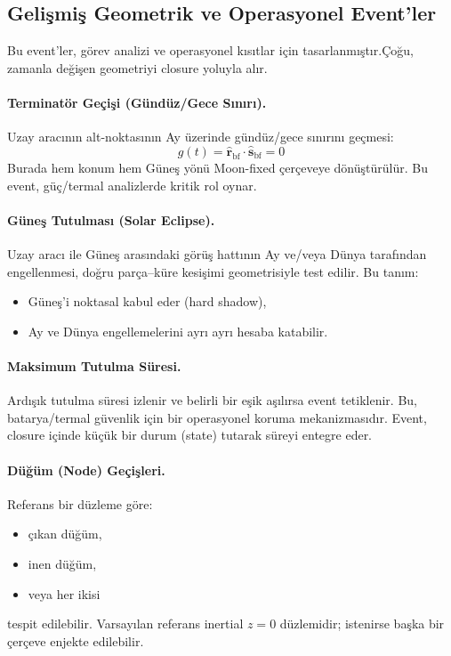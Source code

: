 \subsection*{Gelişmiş Geometrik ve Operasyonel Event’ler}

Bu event’ler, görev analizi ve operasyonel kısıtlar için tasarlanmıştır.Çoğu, zamanla değişen geometriyi closure yoluyla alır.

\paragraph{Terminatör Geçişi (Gündüz/Gece Sınırı).}
Uzay aracının alt-noktasının Ay üzerinde gündüz/gece sınırını geçmesi:
\[
g(t)=\hat{\mathbf{r}}_{\text{bf}}\cdot\hat{\mathbf{s}}_{\text{bf}}=0
\]
Burada hem konum hem Güneş yönü Moon-fixed çerçeveye dönüştürülür.
Bu event, güç/termal analizlerde kritik rol oynar.

\paragraph{Güneş Tutulması (Solar Eclipse).}
Uzay aracı ile Güneş arasındaki görüş hattının Ay ve/veya Dünya tarafından engellenmesi, doğru parça–küre kesişimi geometrisiyle test edilir.
Bu tanım:
\begin{itemize}
  \item Güneş’i noktasal kabul eder (hard shadow),
  \item Ay ve Dünya engellemelerini ayrı ayrı hesaba katabilir.
\end{itemize}

\paragraph{Maksimum Tutulma Süresi.}
Ardışık tutulma süresi izlenir ve belirli bir eşik aşılırsa event tetiklenir. Bu, batarya/termal güvenlik için bir operasyonel koruma mekanizmasıdır. Event, closure içinde küçük bir durum (state) tutarak süreyi entegre eder.

\paragraph{Düğüm (Node) Geçişleri.}
Referans bir düzleme göre:
\begin{itemize}
  \item çıkan düğüm,
  \item inen düğüm,
  \item veya her ikisi
\end{itemize}
tespit edilebilir. Varsayılan referans inertial \(z=0\) düzlemidir;
istenirse başka bir çerçeve enjekte edilebilir.

